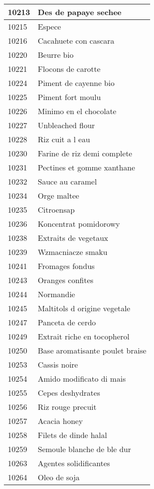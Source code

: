 \begin{longtable}{|l|l|}
10213 & Des de papaye sechee \\ \hline 
10215 & Espece \\ \hline 
10216 & Cacahuete con cascara \\ \hline 
10220 & Beurre bio \\ \hline 
10221 & Flocons de carotte \\ \hline 
10224 & Piment de cayenne bio \\ \hline 
10225 & Piment fort moulu \\ \hline 
10226 & Minimo en el chocolate \\ \hline 
10227 & Unbleached flour \\ \hline 
10228 & Riz cuit a l eau \\ \hline 
10230 & Farine de riz demi complete \\ \hline 
10231 & Pectines et gomme xanthane \\ \hline 
10232 & Sauce au caramel \\ \hline 
10234 & Orge maltee \\ \hline 
10235 & Citroensap \\ \hline 
10236 & Koncentrat pomidorowy \\ \hline 
10238 & Extraits de vegetaux \\ \hline 
10239 & Wzmacniacze smaku \\ \hline 
10241 & Fromages fondus \\ \hline 
10243 & Oranges confites \\ \hline 
10244 & Normandie \\ \hline 
10245 & Maltitols d origine vegetale \\ \hline 
10247 & Panceta de cerdo \\ \hline 
10249 & Extrait riche en tocopherol \\ \hline 
10250 & Base aromatisante poulet braise \\ \hline 
10253 & Cassis noire \\ \hline 
10254 & Amido modificato di mais \\ \hline 
10255 & Cepes deshydrates \\ \hline 
10256 & Riz rouge precuit \\ \hline 
10257 & Acacia honey \\ \hline 
10258 & Filets de dinde halal \\ \hline 
10259 & Semoule blanche de ble dur \\ \hline 
10263 & Agentes solidificantes \\ \hline 
10264 & Oleo de soja \\ \hline 

\end{longtable}

